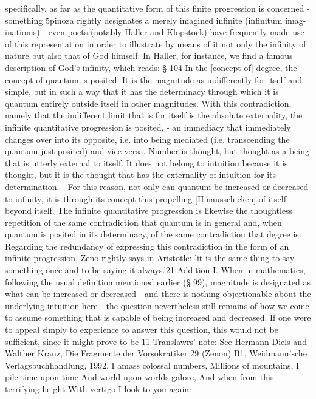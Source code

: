 {{specifically, as far as the quantitative form of this finite progression is concerned -
something 5pinoza rightly designates a merely imagined infinite (infinitum imag-
inationis) - even poets (notably Haller and Klopstock) have frequently made use
of this representation in order to illustrate by means of it not only the infinity
of nature but also that of God himself. In Haller, for instance, we find a famous
description of God's infinity, which reads:
§ 104
In the [concept of] degree, the concept of quantum is posited. It is the
magnitude as indifferently for itself and simple, but in such a way that
it has the determinacy through which it is quantum entirely outside itself
in other magnitudes. With this contradiction, namely that the indifferent
limit that is for itself is the absolute externality, the infinite quantitative
progression is posited, - an immediacy that immediately changes over into
its opposite, i.e. into being mediated (i.e. transcending the quantum just
posited) and vice versa.
Number is thought, but thought as a being that is utterly external
to itself. It does not belong to intuition because it is thought, but
it is the thought that has the externality of intuition for its
determination. - For this reason, not only can quantum be increased
or decreased to infinity, it is through its concept this propelling
[Hinausschicken] of itself beyond itself. The infinite quantitative
progression is likewise the thoughtless repetition of the same
contradiction that quantum is in general and, when quantum is
posited in its determinacy, of the same contradiction that degree is.
Regarding the redundancy of expressing this contradiction in the
form of an infinite progression, Zeno rightly says in Aristotle: 'it is
the same thing to say something once and to be saying it always.'21
Addition I. When in mathematics, following the usual definition mentioned
earlier (§ 99), magnitude is designated as what can be increased or decreased -
and there is nothing objectionable about the underlying intuition here - the
question nevertheless still remains of how we come to assume something that is
capable of being increased and decreased. If one were to appeal simply to experience
to answer this question, this would not be sufficient, since it might prove to be
11
Translawrs' note: See Hermann Diels and Walther Kranz, Die Fragmente der Vorsokratiker 29
(Zenon) B1, Weidmann'sche Verlagsbuchhandlung, 1992.
I amass colossal numbers,
Millions of mountains,
I pile time upon time
And world upon worlds galore,
And when from this terrifying height
With vertigo I look to you again:
}}

